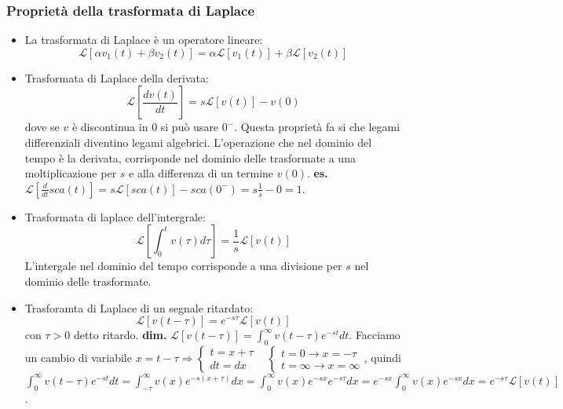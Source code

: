 \subsubsection{Proprietà della trasformata di Laplace}
\begin{itemize}
    \item La trasformata di Laplace è un operatore lineare:
    \[
        \mathcal{L}[\alpha v_1(t) + \beta v_2(t)] = \alpha \mathcal{L}[v_1(t)] + \beta \mathcal{L}[v_2(t)]
    \]
    \item Trasformata di Laplace della derivata: 
    \[
        \mathcal{L}\left[\frac{dv(t)}{dt}\right] = s \mathcal{L}[v(t)]-v(0)
    \] dove se $v$ è discontinua in $0$ si può usare $0^-$.\newline
    Questa proprietà fa si che legami differenziali diventino legami algebrici. L'operazione che nel dominio del tempo è la derivata, corrisponde nel dominio delle trasformate a una moltiplicazione per $s$ e alla differenza di un termine $v(0)$.\newline
    \newline
    \textbf{es.} $\mathcal{L}\left[\frac{d}{dt}sca(t)\right] = s \mathcal{L}[sca(t)] - sca(0^-) = s \frac{1}{s}-0 = 1$.
    \item Trasformata di laplace dell'intergrale:
    \[
        \mathcal{L}\left[\int_{0}^{t}v(\tau)d \tau\right] = \frac{1}{s} \mathcal{L}[v(t)]
    \]
    L'intergale nel dominio del tempo corrisponde a una divisione per $s$ nel dominio delle trasformate.
    \item Trasforamta di Laplace di un segnale ritardato:
    \[
        \mathcal{L}[v(t-\tau)] = e^{-s \tau} \mathcal{L}[v(t)]
    \] con $\tau > 0$ detto ritardo.\newline
    \textbf{dim.} $\mathcal{L}[v(t-\tau)] = \int_{0}^{\infty}v(t-\tau) e^{-st}dt$. Facciamo un cambio di variabile $x = t-\tau \Rightarrow \begin{cases}
        t = x + \tau\\ dt = dx
    \end{cases} \;\;\;\begin{cases}
        t=0 \rightarrow x = - \tau\\ t= \infty \rightarrow  x= \infty
    \end{cases}$, quindi $\int_{0}^{\infty}v(t-\tau) e^{-st}dt = \int_{-\tau}^{\infty} v(x) e^{-s(x+ \tau)}dx = \int_{0}^{\infty}v(x) e^{-sx}e^{-s \tau}dx = e^{-sx}\int_{0}^{\infty}v(x)e^{-sx}dx = e^{-s \tau} \mathcal{L}[v(t)]$.
\end{itemize}
\ \newline